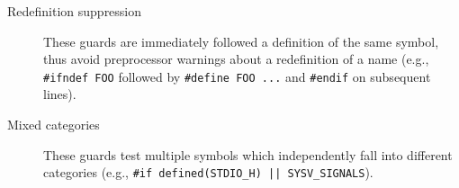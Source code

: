 \begin{description}
\item[Redefinition suppression] These guards are immediately
      followed a definition of the same symbol, thus avoid preprocessor
      warnings about a redefinition of a name (e.g., \texttt{#ifndef
      FOO} followed by \texttt{#define FOO ...} and \texttt{#endif} on
      subsequent lines).

\item[Mixed categories] These guards test multiple symbols
      which independently fall into different categories (e.g.,
      \texttt{#if defined(STDIO_H) || SYSV_SIGNALS}).

\end{description}
